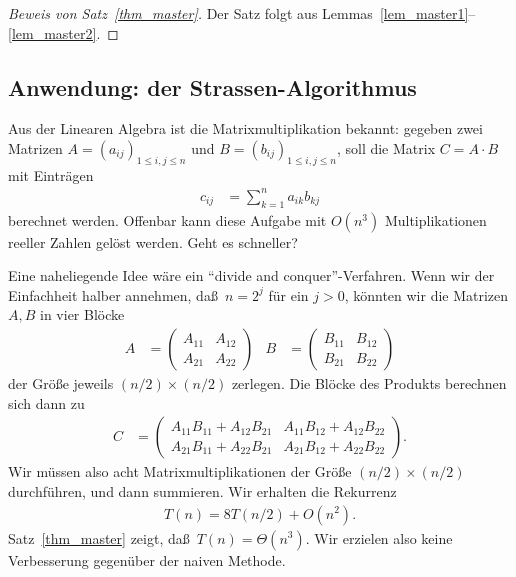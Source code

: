 \documentclass[10pt,reqno]{amsart}
\numberwithin{equation}{section}
\newcommand\Lem{Lemma}
\newcommand\Thm{Satz}
\begin{document}
\begin{proof}[Beweis von \Thm~\ref{thm_master}]
	Der Satz folgt aus \Lem s~\ref{lem_master1}--\ref{lem_master2}.
\end{proof}

\subsection{Anwendung: der Strassen-Algorithmus}\label{sec_master}
Aus der Linearen Algebra ist die Matrixmultiplikation bekannt: gegeben zwei Matrizen $A=(a_{ij})_{1\leq i,j\leq n}$ und $B=(b_{ij})_{1\leq i,j\leq n}$, soll die Matrix $C=A\cdot B$ mit Eintr\"agen
\begin{align*}
	c_{ij}&=\sum_{k=1}^na_{ik}b_{kj}
\end{align*}
berechnet werden.
Offenbar kann diese Aufgabe mit $O(n^3)$ Multiplikationen reeller Zahlen gel\"ost werden.
Geht es schneller?

Eine naheliegende Idee w\"are ein ``divide and conquer''-Verfahren.
Wenn wir der Einfachheit halber annehmen, da\ss\ $n=2^j$ f\"ur ein $j>0$, k\"onnten wir die Matrizen $A,B$ in vier Bl\"ocke
\begin{align*}
	A&=\begin{pmatrix}A_{11}&A_{12}\\A_{21}&A_{22}\end{pmatrix}&
	B&=\begin{pmatrix}B_{11}&B_{12}\\B_{21}&B_{22}\end{pmatrix}
\end{align*}
der Gr\"o\ss e jeweils $(n/2)\times(n/2)$ zerlegen.
Die Bl\"ocke des Produkts berechnen sich dann zu
\begin{align*}
	C&=\begin{pmatrix} A_{11}B_{11}+A_{12}B_{21}&A_{11}B_{12}+A_{12}B_{22}\\ A_{21}B_{11}+A_{22}B_{21}&A_{21}B_{12}+A_{22}B_{22} \end{pmatrix}.
\end{align*}
Wir m\"ussen also acht Matrixmultiplikationen der Gr\"o\ss e $(n/2)\times(n/2)$ durchf\"uhren, und dann summieren.
Wir erhalten die Rekurrenz
\begin{align*}
	T(n)=8T(n/2)+O(n^2).
\end{align*}
\Thm~\ref{thm_master} zeigt, da\ss\ $T(n)=\Theta(n^3)$.
Wir erzielen also keine Verbesserung gegen\"uber der naiven Methode.
\end{document}
